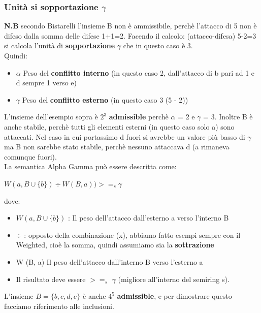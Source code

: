 \subsubsection{Unità si sopportazione $\gamma$}
\textbf{N.B} secondo Bistarelli l’insieme B non è ammissibile, perchè l’attacco di 5 non è difeso dalla somma delle difese 1+1=2. Facendo il calcolo: (attacco-difesa) 5-2=3 si calcola l’unità di \textbf{sopportazione} $\gamma$ che in questo caso è 3.
\\Quindi:
\begin{itemize}
    \item $\alpha$ Peso del \textbf{conflitto interno} (in questo caso 2, dall’attacco di b pari ad 1 e d sempre 1 verso e)
    \item $\gamma$ Peso del \textbf{conflitto esterno} (in questo caso 3 (5 - 2))
\end{itemize}
L’insieme dell’esempio sopra è $2^3$ \textbf{admissible} perchè $\alpha$ = 2 e $\gamma$ = 3. Inoltre B è anche stabile, perchè tutti gli elementi esterni (in questo caso solo a) sono attaccati. Nel caso in cui portassimo d fuori si avrebbe un valore più basso di $\gamma$ ma B non sarebbe stato stabile, perchè nessuno attaccava d (a rimaneva comunque fuori).
\\
La semantica Alpha Gamma può essere descritta come:
\begin{center}
    $W (a, B \cup \{b\}) \div W (B, a)) >=_s \gamma$
\end{center}
dove:
\begin{itemize}
    \item $W (a, B \cup \{b\})$ : Il peso dell’attacco dall’esterno a verso l’interno B
    \item $\div$ : opposto della combinazione (x), abbiamo fatto esempi sempre con il Weighted, cioè la somma, quindi assumiamo sia la \textbf{sottrazione}
    \item W (B, a) Il peso dell’attacco dall’interno B verso l’esterno a
    \item Il risultato deve essere $>=_s$ $\gamma$ (migliore all’interno del semiring s).
\end{itemize}
L’insieme $B = \{b, c, d, e\}$ è anche $4^5$ \textbf{admissible}, e per dimostrare questo facciamo riferimento alle inclusioni.
\newpage
